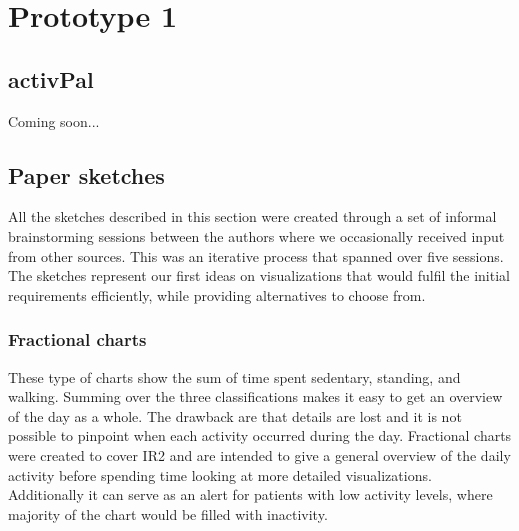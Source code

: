 \chapter{Prototype 1}

\section{activPal}
Coming soon...


\section{Paper sketches}
All the sketches described in this section were created through a set of informal brainstorming sessions between the authors where we occasionally received input from other sources. This was an iterative process that spanned over five sessions. The sketches represent our first ideas on visualizations that would fulfil the initial requirements efficiently, while providing alternatives to choose from. 

\subsection{Fractional charts}
These type of charts show the sum of time spent sedentary, standing, and walking. Summing over the three classifications makes it easy to get an overview of the day as a whole. The drawback are that details are lost and it is not possible to pinpoint when each activity occurred during the day. Fractional charts were created to cover IR2 and are intended to give a general overview of the daily activity before spending time looking at more detailed visualizations. Additionally it can serve as an alert for patients with low activity levels, where majority of the chart would be filled with inactivity.

